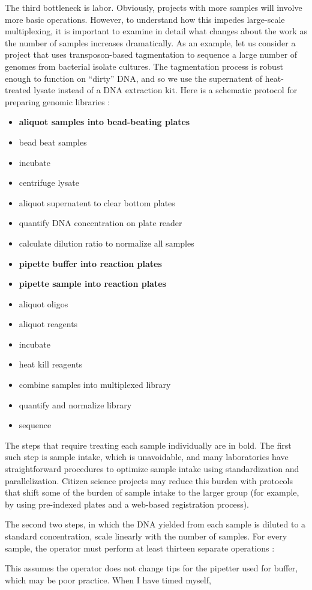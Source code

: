 \begin{refsection}
The third bottleneck is labor. Obviously, projects with more samples will involve more basic operations. However, to understand how this impedes large-scale multiplexing, it is important to examine in detail what changes about the work as the number of samples increases dramatically. As an example, let us consider a project that uses transposon-based tagmentation \cite{tagmentation} to sequence a large number of genomes from bacterial isolate cultures. The tagmentation process is robust enough to function on ``dirty'' DNA, and so we use the supernatent of heat-treated lysate instead of a DNA extraction kit. Here is a schematic protocol for preparing genomic libraries :

\begin{itemize}[noitemsep]
\item \textbf{aliquot samples into bead-beating plates}
\item bead beat samples
\item incubate
\item centrifuge lysate
\item aliquot supernatent to clear bottom plates
\item quantify DNA concentration on plate reader
\item calculate dilution ratio to normalize all samples
\item \textbf{pipette buffer into reaction plates}
\item \textbf{pipette sample into reaction plates}
\item aliquot oligos
\item aliquot reagents
\item incubate
\item heat kill reagents
\item combine samples into multiplexed library
\item quantify and normalize library
\item sequence
\end{itemize}

\noindent The steps that require treating each sample individually are in bold. The first such step is sample intake, which is unavoidable, and many laboratories have straightforward procedures to optimize sample intake using standardization and parallelization. Citizen science projects may reduce this burden with protocols that shift some of the burden of sample intake to the larger group (for example, by using pre-indexed plates and a web-based registration process). 

The second two steps, in which the DNA yielded from each sample is diluted to a standard concentration, scale linearly with the number of samples. For every sample, the operator must perform at least thirteen separate operations :



\noindent This assumes the operator does not change tips for the pipetter used for buffer, which may be poor practice. When I have timed myself, 


\printbibliography[heading=subbibliography]

\end{refsection}